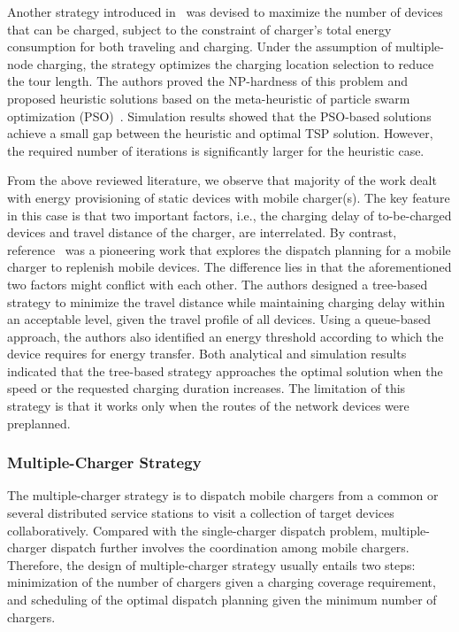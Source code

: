 \documentclass[twocolumn,10pt]{IEEEtran}
\begin{document}
Another strategy introduced in~\cite{K2012Li} was devised to maximize the number of devices that can be charged, subject to the constraint of charger's total energy consumption for both traveling and charging. Under the assumption of multiple-node charging, the strategy optimizes the charging location selection to reduce the tour length. The authors proved the NP-hardness of this problem and proposed heuristic solutions based on the meta-heuristic of particle swarm optimization (PSO)~\cite{M.2007Clerc}. Simulation results showed that the PSO-based solutions achieve a small gap between the heuristic and optimal TSP solution. However, the required number of iterations is significantly larger for the heuristic case.    
 
From the above reviewed literature, we observe that majority of the work dealt with energy provisioning of static devices with mobile charger(s). The key feature in this case is that two important factors, i.e., the charging delay of to-be-charged devices and travel distance of the charger, are interrelated. By contrast, reference~\cite{2014L.He} was a pioneering work that explores the dispatch planning for a mobile charger to replenish mobile devices. The difference lies in that the aforementioned two factors might conflict with each other. The authors designed a tree-based strategy to minimize the travel distance while maintaining charging delay within an acceptable level,
given the travel profile of all devices. Using a queue-based approach, the authors also identified an energy threshold according to which the device requires for energy transfer. Both analytical and simulation results indicated that the tree-based strategy approaches the optimal solution when the speed or the requested charging duration increases. The limitation of this strategy is that it works only when the routes of the network devices were preplanned.  
 


\subsubsection{Multiple-Charger Strategy}

The multiple-charger strategy is to dispatch mobile chargers from a common or several distributed service stations to visit a collection of target devices collaboratively. Compared with the single-charger dispatch problem, multiple-charger dispatch further involves the coordination among mobile chargers.
Therefore, the design of multiple-charger strategy usually entails two steps: minimization of the number of chargers given a charging coverage requirement, and scheduling of the optimal dispatch planning given the minimum number of chargers. 
\end{document}
